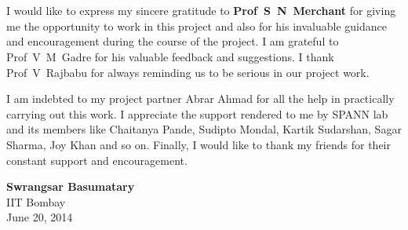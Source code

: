 \chapter*{}


I would like to express my sincere gratitude to \textbf{Prof~S~N~Merchant}
for giving me the opportunity to work in this project and also for his
invaluable guidance and encouragement during the course of the project. I am
grateful to Prof~V~M~Gadre for his valuable feedback and suggestions. I thank
Prof~V~Rajbabu for always reminding us to be serious in our project work.

I am indebted to my project partner Abrar Ahmad 
for all the help in practically carrying out this work. I appreciate the 
support rendered to me by SPANN lab and its members like Chaitanya Pande, 
Sudipto Mondal, Kartik Sudarshan, Sagar Sharma, Joy Khan and so on. Finally,
I would like to thank my friends for their constant support and
encouragement.

\vspace{1.5cm}

\begin{flushright}
\textbf{Swrangsar Basumatary} \\
IIT Bombay \\
June 20, 2014
\end{flushright}